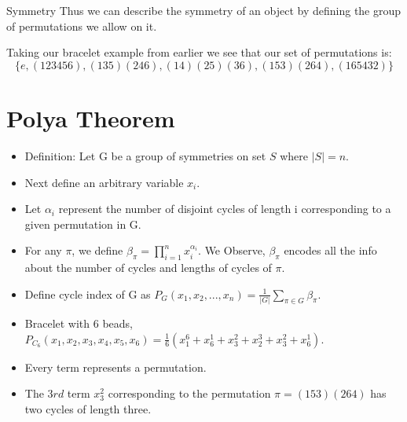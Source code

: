 \documentclass{beamer}
\begin{document}
\begin{frame}{Symmetry}
	Thus we can describe the symmetry of an object by defining the group of permutations we allow on it.

  Taking our bracelet example from earlier we see that our set of permutations is:
  \[\{e,(123456),(135)(246),(14)(25)(36),(153)(264),(165432)\}\]
\end{frame}
\section{Polya Theorem}

\begin{frame}
\begin{itemize}

\pause
\item Definition: Let G be a group of symmetries on set $S$ where ${|S|} = n$.

\pause
\item Next define an arbitrary variable $x_{i}$.

\pause
\item Let $\alpha_{i}$ represent the number of disjoint cycles of length i corresponding to a given permutation in G.

\pause
\item For any ${\pi}$, we define $\beta_{\pi}=\displaystyle\prod_{i=1}^{n} x_{i}^{\alpha_{i}}$. We Observe, $\beta_{\pi}$ encodes all the info about the number of cycles and lengths of cycles of ${\pi}$.

\end{itemize}
\end{frame}


\begin{frame}
\begin{itemize}

\item Define cycle index of G as $P_{G}(x_{1},x_{2},...,x_{n})=\frac{1}{\vert{G}\vert}\displaystyle\sum_{{\pi} \in G}{\beta_{\pi}}$.

\end{itemize}
\end{frame}


\begin{frame}
\begin{itemize}

\pause
\item Bracelet with 6 beads, $P_{C_{6}}(x_{1},x_{2},x_{3},x_{4},x_{5},x_{6})=\frac{1}{6}(x_{1}^{6} + x_{6}^{1} + x_{3}^{2} + x_{2}^{3} + x_{3}^{2} + x_{6}^{1})$.

\pause
\item Every term represents a permutation.

\pause
\item The $3rd$ term $x_{3}^{2}$ corresponding to the permutation ${\pi} = (153)(264)$ has two cycles of length three.


\end{itemize}
\end{frame}
\end{document}
